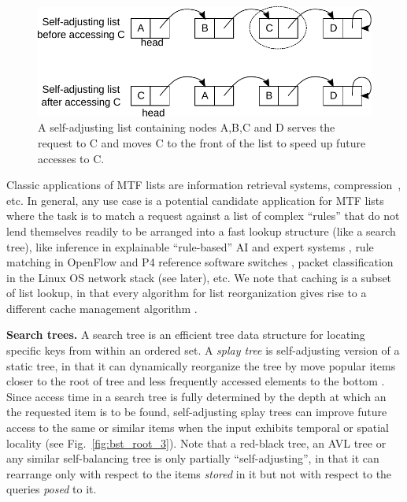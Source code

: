 \begin{figure}
  \centering
  \includegraphics[width=.85\linewidth]{fig/mtf.pdf}
  \caption{A self-adjusting list containing nodes A,B,C and D serves the request to C and moves C to the front of the list to speed up future accesses to C.}
  \label{fig:mtf-example}
\end{figure}

Classic applications of MTF lists are information retrieval systems, compression~\cite{BentleySTW86}, etc. In general, any use case is a potential candidate application for MTF lists where the task is to match a request against a list of complex ``rules'' that do not lend themselves readily to be arranged into a fast lookup structure (like a search tree), like inference in explainable ``rule-based'' AI and expert systems \cite{dovsilovic2018explainable}, rule matching in OpenFlow and P4 reference software switches \cite{openflow}, packet classification in the Linux OS network stack (see later), etc.  We note that caching is a subset of list lookup, in that every algorithm for list reorganization gives rise to a different cache management algorithm \cite{SleatorT85}.  

\noindent%
\textbf{Search trees.} %
A search tree is an efficient tree data structure for locating specific keys from within an ordered set. A \emph{splay tree} is self-adjusting version of a static tree, in that it can dynamically reorganize the tree by move popular items closer to the root of tree and less frequently accessed elements to the bottom \cite{SleatorT85Splay, BoseDL08, Avin0020}. Since access time in a search tree is fully determined by the depth at which an the requested item is to be found, self-adjusting splay trees can improve future access to the same or similar items when the input exhibits temporal or spatial locality (see Fig.~\ref{fig:bst_root_3}).  Note that a red-black tree, an AVL tree or any similar self-balancing tree is only partially ``self-adjusting'', in that it can rearrange only with respect to the items \emph{stored} in it but not with respect to the queries \emph{posed} to it.


